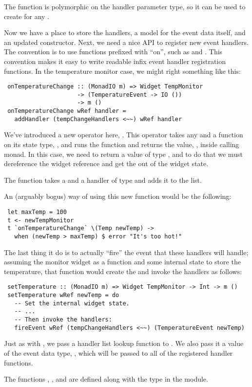 The  function is polymorphic on the handler parameter
type, so it can be used to create  for any .

Now we have a place to store the handlers, a model for the event data
itself, and an updated constructor.  Next, we need a nice API to
register new event handlers.  The  convention is to use
functions prefixed with ``on'', such as  and
.  This convention makes it easy to write readable
infix event handler registration functions.  In the temperature
monitor case, we might right something like this:

\begin{verbatim}
 onTemperatureChange :: (MonadIO m) => Widget TempMonitor
                     -> (TemperatureEvent -> IO ())
                     -> m ()
 onTemperatureChange wRef handler =
   addHandler (tempChangeHandlers <~~) wRef handler
\end{verbatim}

We've introduced a new operator here, \fw{<\string~\string~}.  This
operator takes any  and a function on its state type,
, and runs the function and returns the value, ,
inside calling monad.  In this case, we need to return a value of type
, and to do that we must dereference the
widget reference and get the  out of the widget
state.

The  function takes a  and a handler of
type  and adds it to the  list.

An (arguably bogus) way of using this new function would be the
following:

\begin{verbatim}
 let maxTemp = 100
 t <- newTempMonitor
 t `onTemperatureChange` \(Temp newTemp) ->
   when (newTemp > maxTemp) $ error "It's too hot!"
\end{verbatim}

The last thing it do is to actually ``fire'' the event that these
handlers will handle; assuming the monitor widget as a
 function and some internal state to store the
temperature, that function would create the  and
invoke the handlers as follows:

\begin{verbatim}
 setTemperature :: (MonadIO m) => Widget TempMonitor -> Int -> m ()
 setTemperature wRef newTemp = do
   -- Set the internal widget state.
   -- ...
   -- Then invoke the handlers:
   fireEvent wRef (tempChangeHandlers <~~) (TemperatureEvent newTemp)
\end{verbatim}

Just as with , we pass a handler list lookup function
to .  We also pass it a value of the event data type,
, which will be passed to all of the registered handler
functions.

The functions , , and 
are defined along with the  type in the 
module.
